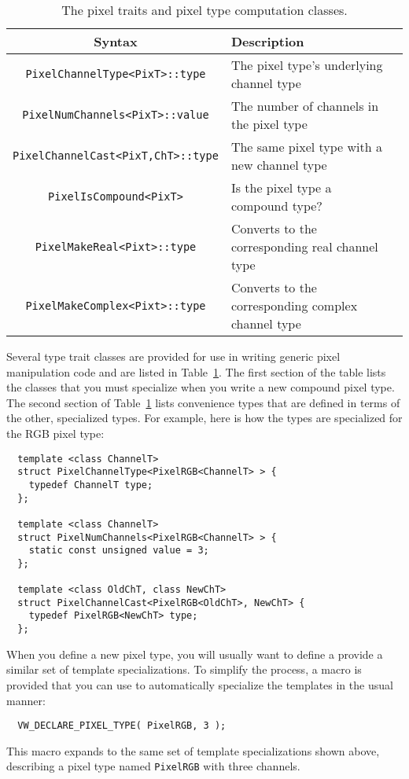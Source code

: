 \begin{table}[t]\begin{centering}
\begin{tabular}{|c|l|l|} \hline
Syntax & Description \\ \hline \hline
\verb#PixelChannelType<PixT>::type# & The pixel type's underlying channel type \\ \hline
\verb#PixelNumChannels<PixT>::value# & The number of channels in the pixel type \\ \hline
\verb#PixelChannelCast<PixT,ChT>::type# & The same pixel type with a new channel type \\ \hline
\hline
\verb#PixelIsCompound<PixT># & Is the pixel type a compound type? \\ \hline
\verb#PixelMakeReal<Pixt>::type# & Converts to the corresponding real channel type \\ \hline
\verb#PixelMakeComplex<Pixt>::type# & Converts to the corresponding complex channel type \\ \hline
\end{tabular}
\caption{The pixel traits and pixel type computation classes.}
\label{tbl:pixel-traits}
\end{centering}\end{table}

Several type trait classes are provided for use in writing generic 
pixel manipulation code and are listed in Table~\ref{tbl:pixel-traits}.
The first section of the table lists the classes that you must specialize 
when you write a new compound pixel type.  The second section of 
Table~\ref{tbl:pixel-traits} lists convenience types that are defined 
in terms of the other, specialized types. For example, here is how 
the types are specialized for the RGB pixel type:
\begin{verbatim}
  template <class ChannelT>
  struct PixelChannelType<PixelRGB<ChannelT> > {
    typedef ChannelT type;
  };

  template <class ChannelT>
  struct PixelNumChannels<PixelRGB<ChannelT> > {
    static const unsigned value = 3;
  };

  template <class OldChT, class NewChT>
  struct PixelChannelCast<PixelRGB<OldChT>, NewChT> {
    typedef PixelRGB<NewChT> type;
  };
\end{verbatim}
When you define a new pixel type, you will usually want to define a 
provide a similar set of template specializations.  To simplify 
the process, a macro is provided that you can use to automatically 
specialize the templates in the usual manner:
\begin{verbatim}
  VW_DECLARE_PIXEL_TYPE( PixelRGB, 3 );
\end{verbatim}
This macro expands to the same set of template specializations shown
above, describing a pixel type named \verb#PixelRGB# with three
channels.

